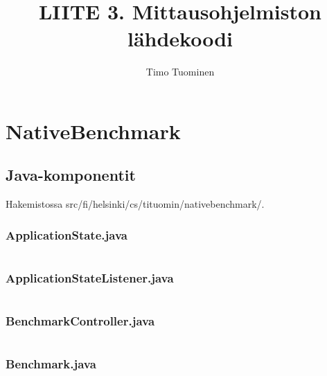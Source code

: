 \documentclass[a4paper,12pt]{article}
\title{LIITE 3. Mittausohjelmiston lähdekoodi}
\date{}
\author{Timo Tuominen}
\begin{document}
\maketitle{}

\renewcommand{\theFancyVerbLine}{
  \sffamily\textcolor[rgb]{0.5,0.5,0.5}{\scriptsize\arabic{FancyVerbLine}}}

\renewcommand*\contentsname{Tiedostot}
\tableofcontents

\newpage
\section{NativeBenchmark}
\subsection{Java-komponentit}
Hakemistossa src/fi/helsinki/cs/tituomin/nativebenchmark/.
\vspace{1cm}
\subsubsection{ApplicationState.java}
\inputminted[fontsize=\small, linenos, numbersep=5pt, tabsize=4, frame=topline,framesep=0.8cm]{java}{/home/tituomin/StudioProjects/nativebenchmark/src/fi/helsinki/cs/tituomin/nativebenchmark/ApplicationState.java}
\vspace{1cm}
\subsubsection{ApplicationStateListener.java}
\inputminted[fontsize=\small, linenos, numbersep=5pt, tabsize=4, frame=topline,framesep=0.8cm]{java}{/home/tituomin/StudioProjects/nativebenchmark/src/fi/helsinki/cs/tituomin/nativebenchmark/ApplicationStateListener.java}
\vspace{1cm}
\subsubsection{BenchmarkController.java}
\inputminted[fontsize=\small, linenos, numbersep=5pt, tabsize=4, frame=topline,framesep=0.8cm]{java}{/home/tituomin/StudioProjects/nativebenchmark/src/fi/helsinki/cs/tituomin/nativebenchmark/BenchmarkController.java}
\vspace{1cm}
\subsubsection{Benchmark.java}
\inputminted[fontsize=\small, linenos, numbersep=5pt, tabsize=4, frame=topline,framesep=0.8cm]{java}{/home/tituomin/StudioProjects/nativebenchmark/src/fi/helsinki/cs/tituomin/nativebenchmark/Benchmark.java}
\vspace{1cm}
\end{document}
